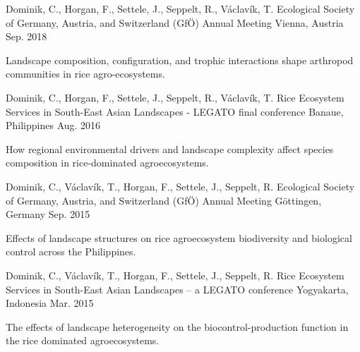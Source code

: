 

\begin{cventries}

  \cventry
    {Dominik, C., Horgan, F., Settele, J., Seppelt, R., Václavík, T.} %
    {Ecological Society of Germany, Austria, and Switzerland (GfÖ) Annual Meeting} %
    {Vienna, Austria} %
    {Sep. 2018} %
    {
      \begin{cvitems} %
        \item {Landscape composition, configuration, and trophic interactions shape arthropod communities in rice agro-ecosystems.}
      \end{cvitems}
    }
    
  \cventry
    {Dominik, C., Horgan, F., Settele, J., Seppelt, R., Václavík, T.} %
    {Rice Ecosystem Services in South-East Asian Landscapes - LEGATO final conference} %
    {Banaue, Philippines} %
    {Aug. 2016} %
    {
      \begin{cvitems} %
        \item {How regional environmental drivers and landscape complexity affect species composition in rice-dominated agroecosystems.}
      \end{cvitems}
    }

  \cventry
    {Dominik, C., Václavík, T., Horgan, F., Settele, J., Seppelt, R.} %
    {Ecological Society of Germany, Austria, and Switzerland (GfÖ) Annual Meeting} %
    {Göttingen, Germany} %
    {Sep. 2015} %
    {
      \begin{cvitems} %
        \item {Effects of landscape structures on rice agroecosystem biodiversity and biological control across the Philippines.}
      \end{cvitems}
    }
    
  \cventry
    {Dominik, C., Václavík, T., Horgan, F., Settele, J., Seppelt, R.} %
    {Rice Ecosystem Services in South-East Asian Landscapes – a LEGATO conference} %
    {Yogyakarta, Indonesia} %
    {Mar. 2015} %
    {
      \begin{cvitems} %
        \item {The effects of landscape heterogeneity on the biocontrol-production function in the rice dominated agroecosystems.}
      \end{cvitems}
    }


\end{cventries}
